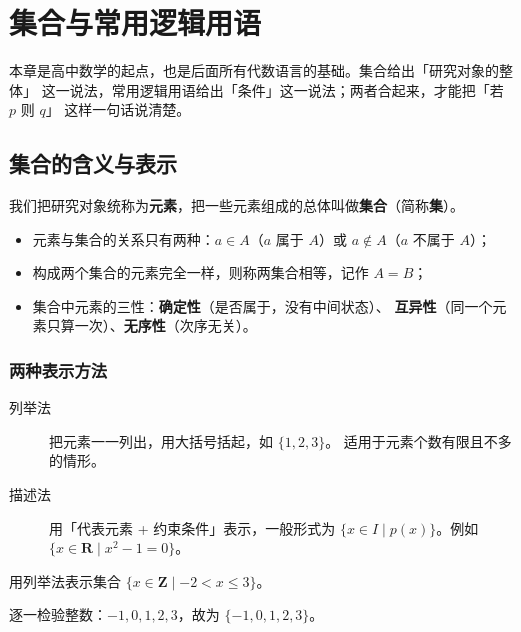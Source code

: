 \chapter{集合与常用逻辑用语}

本章是高中数学的起点，也是后面所有代数语言的基础。集合给出「研究对象的整体」
这一说法，常用逻辑用语给出「条件」这一说法；两者合起来，才能把「若 $p$ 则 $q$」
这样一句话说清楚。

\section{集合的含义与表示}

\begin{definition}
我们把研究对象统称为\textbf{元素}，把一些元素组成的总体叫做\textbf{集合}（简称\textbf{集}）。
\end{definition}

\begin{itemize}
  \item 元素与集合的关系只有两种：$a\in A$（$a$ 属于 $A$）或 $a\notin A$（$a$ 不属于 $A$）；
  \item 构成两个集合的元素完全一样，则称两集合相等，记作 $A=B$；
  \item 集合中元素的三性：\textbf{确定性}（是否属于，没有中间状态）、
        \textbf{互异性}（同一个元素只算一次）、\textbf{无序性}（次序无关）。
\end{itemize}

\subsection{两种表示方法}

\begin{description}
  \item[列举法] 把元素一一列出，用大括号括起，如 $\{1,2,3\}$。
        适用于元素个数有限且不多的情形。
  \item[描述法] 用「代表元素 + 约束条件」表示，一般形式为
        $\{x\in I\mid p(x)\}$。例如 $\{x\in\mathbf{R}\mid x^2-1=0\}$。
\end{description}

\begin{example}
用列举法表示集合 $\{x\in\mathbf{Z}\mid -2<x\le 3\}$。
\end{example}
\begin{solution}
逐一检验整数：$-1,0,1,2,3$，故为 $\{-1,0,1,2,3\}$。
\end{solution}


